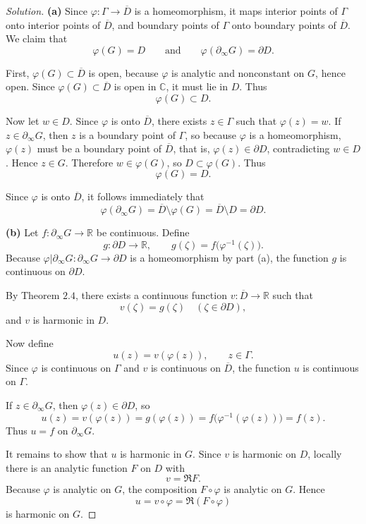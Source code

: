 \documentclass[12pt, a4paper]{report}
\theoremstyle{spaced}
\begin{document}
\begin{proof}[Solution]
	\textbf{(a)} Since \(\varphi:\Gamma\to \overline D\) is a homeomorphism, it maps interior points of \(\Gamma\) onto interior points of \(\overline D\), and boundary points of \(\Gamma\) onto boundary points of \(\overline D\). We claim that
	\[
		\varphi(G)=D
		\qquad\text{and}\qquad
		\varphi(\partial_\infty G)=\partial D.
	\]

	First, \(\varphi(G)\subset \overline D\) is open, because \(\varphi\) is analytic and nonconstant on \(G\), hence open. Since \(\varphi(G)\subset \overline D\) is open in \(\mathbb C\), it must lie in \(D\). Thus
	\[
		\varphi(G)\subset D.
	\]

	Now let \(w\in D\). Since \(\varphi\) is onto \(\overline D\), there exists \(z\in \Gamma\) such that \(\varphi(z)=w\). If \(z\in \partial_\infty G\), then \(z\) is a boundary point of \(\Gamma\), so because \(\varphi\) is a homeomorphism, \(\varphi(z)\) must be a boundary point of \(\overline D\), that is, \(\varphi(z)\in \partial D\), contradicting \(w\in D\). Hence \(z\in G\). Therefore \(w\in \varphi(G)\), so \(D\subset \varphi(G)\). Thus
	\[
		\varphi(G)=D.
	\]

	Since \(\varphi\) is onto \(\overline D\), it follows immediately that
	\[
		\varphi(\partial_\infty G)=\overline D\setminus \varphi(G)=\overline D\setminus D=\partial D.
	\]

	\medskip

	\textbf{(b)} Let \(f:\partial_\infty G\to \mathbb R\) be continuous. Define
	\[
		g:\partial D\to \mathbb R,\qquad
		g(\zeta)=f\bigl(\varphi^{-1}(\zeta)\bigr).
	\]
	Because \(\varphi|\partial_\infty G:\partial_\infty G\to \partial D\) is a homeomorphism by part (a), the function \(g\) is continuous on \(\partial D\).

	By Theorem \(2.4\), there exists a continuous function \(v:\overline D\to \mathbb R\) such that
	\[
		v(\zeta)=g(\zeta)\quad (\zeta\in \partial D),
	\]
	and \(v\) is harmonic in \(D\).

	Now define
	\[
		u(z)=v(\varphi(z)),\qquad z\in \Gamma.
	\]
	Since \(\varphi\) is continuous on \(\Gamma\) and \(v\) is continuous on \(\overline D\), the function \(u\) is continuous on \(\Gamma\).

	If \(z\in \partial_\infty G\), then \(\varphi(z)\in \partial D\), so
	\[
		u(z)=v(\varphi(z))=g(\varphi(z))
		= f\bigl(\varphi^{-1}(\varphi(z))\bigr)=f(z).
	\]
	Thus \(u=f\) on \(\partial_\infty G\).

	It remains to show that \(u\) is harmonic in \(G\). Since \(v\) is harmonic on \(D\), locally there is an analytic function \(F\) on \(D\) with
	\[
		v=\Re F.
	\]
	Because \(\varphi\) is analytic on \(G\), the composition \(F\circ \varphi\) is analytic on \(G\). Hence
	\[
		u=v\circ \varphi=\Re(F\circ \varphi)
	\]
	is harmonic on \(G\).


\end{proof}
\end{document}
